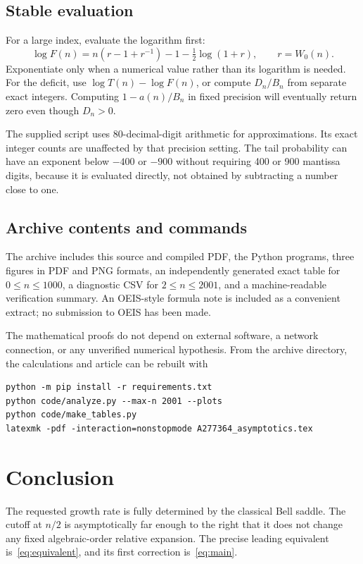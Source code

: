 \documentclass[11pt,a4paper]{article}
\numberwithin{equation}{section}
\theoremstyle{remark}
\begin{document}
\subsection{Stable evaluation}
For a large index, evaluate the logarithm first:
\begin{equation}\label{eq:eval}
 \log F(n)=n(r-1+r^{-1})-1-\tfrac12\log(1+r),\qquad r=W_0(n).
\end{equation}
Exponentiate only when a numerical value rather than its logarithm is
needed. For the deficit, use $\log T(n)-\log F(n)$, or compute $D_n/B_n$
from separate exact integers. Computing $1-a(n)/B_n$ in fixed precision
will eventually return zero even though $D_n>0$.

The supplied script uses 80-decimal-digit arithmetic for approximations.
Its exact integer counts are unaffected by that precision setting.
The tail probability can have an exponent below $-400$ or $-900$ without
requiring 400 or 900 mantissa digits, because it is evaluated directly,
not obtained by subtracting a number close to one.

\subsection{Archive contents and commands}
The archive includes this source and compiled PDF, the Python programs,
three figures in PDF and PNG formats, an independently generated exact
table for $0\le n\le1000$, a diagnostic CSV for $2\le n\le2001$, and a
machine-readable verification summary. An OEIS-style formula note is
included as a convenient extract; no submission to OEIS has been made.

The mathematical proofs do not depend on external software, a network
connection, or any unverified numerical hypothesis. From the archive
directory, the calculations and article can be rebuilt with
\begin{lstlisting}
python -m pip install -r requirements.txt
python code/analyze.py --max-n 2001 --plots
python code/make_tables.py
latexmk -pdf -interaction=nonstopmode A277364_asymptotics.tex
\end{lstlisting}

\FloatBarrier
\section{Conclusion}
The requested growth rate is fully determined by the classical Bell
saddle. The cutoff at $n/2$ is asymptotically far enough to the right that
it does not change any fixed algebraic-order relative expansion. The
precise leading equivalent is~\eqref{eq:equivalent}, and its first
correction is~\eqref{eq:main}.
\end{document}

